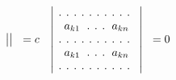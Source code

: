 \documentclass[11pt]{amsbook}
\begin{document}
\begin{thm}
\begin{align}
\begin{vmatrix}
			 \notag
		\end{vmatrix}
			\hspace{6pt}= c \hspace{8pt}
		\begin{vmatrix}
			\hspace{4pt}.\hspace{4pt}.\hspace{4pt}.\hspace{4pt}.\hspace{4pt}.\hspace{4pt}.\hspace{4pt}.\hspace{4pt}.\hspace{4pt}.\hspace{4pt}.						\hspace{4pt}\hspace{4pt}\\ 
 			a_{k1}\hspace{6pt} .\hspace{4pt}.\hspace{4pt}.\hspace{6pt} a_{kn} \\ 
			\hspace{4pt}.\hspace{4pt}.\hspace{4pt}.\hspace{4pt}.\hspace{4pt}.\hspace{4pt}.\hspace{4pt}.\hspace{4pt}.\hspace{4pt}.\hspace{4pt}.						\hspace{4pt}\hspace{4pt}\\ 
			a_{k1}\hspace{6pt} .\hspace{4pt}.\hspace{4pt}.\hspace{6pt} a_{kn}\\
			\hspace{4pt}.\hspace{4pt}.\hspace{4pt}.\hspace{4pt}.\hspace{4pt}.\hspace{4pt}.\hspace{4pt}.\hspace{4pt}.\hspace{4pt}.\hspace{4pt}.						\hspace{4pt}\hspace{4pt}
			 \notag
		\end{vmatrix}
		\hspace{6pt}= 0
		\end{align}
	\end{thm}
\end{document}
